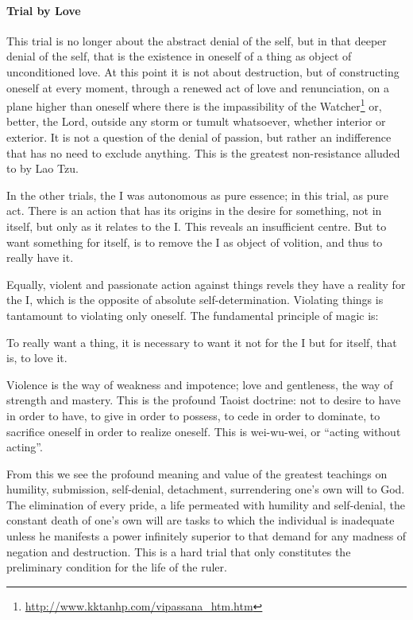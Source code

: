 \paragraph{Trial by Love}


This trial is no longer about the abstract denial of the self, but in that deeper denial of the self, that is the existence in oneself of a thing as object of unconditioned love. At this point it is not about destruction, but of constructing oneself at every moment, through a renewed act of love and renunciation, on a plane higher than oneself where there is the impassibility of the Watcher\footnote{\url{http://www.kktanhp.com/vipassana\_htm.htm}} or, better, the Lord, outside any storm or tumult whatsoever, whether interior or exterior. It is not a question of the denial of passion, but rather an indifference that has no need to exclude anything. This is the greatest non-resistance alluded to by Lao Tzu.

In the other trials, the I was autonomous as pure essence; in this trial, as pure act. There is an action that has its origins in the desire for something, not in itself, but only as it relates to the I. This reveals an insufficient centre. But to want something for itself, is to remove the I as object of volition, and thus to really have it.

Equally, violent and passionate action against things revels they have a reality for the I, which is the opposite of absolute self-determination. Violating things is tantamount to violating only oneself. The fundamental principle of magic is:

\begin{quotex}
To really want a thing, it is necessary to want it not for the I but for itself, that is, to love it.
\end{quotex}


Violence is the way of weakness and impotence; love and gentleness, the way of strength and mastery. This is the profound Taoist doctrine: not to desire to have in order to have, to give in order to possess, to cede in order to dominate, to sacrifice oneself in order to realize oneself. This is wei-wu-wei, or ``acting without acting''.

From this we see the profound meaning and value of the greatest teachings on humility, submission, self-denial, detachment, surrendering one's own will to God. The elimination of every pride, a life permeated with humility and self-denial, the constant death of one's own will are tasks to which the individual is inadequate unless he manifests a power infinitely superior to that demand for any madness of negation and destruction. This is a hard trial that only constitutes the preliminary condition for the life of the ruler.

